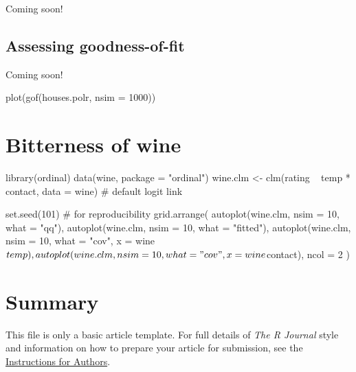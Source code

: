Coming soon!


\subsection{Assessing goodness-of-fit}

Coming soon!

\begin{example}
  plot(gof(houses.polr, nsim = 1000))
\end{example}


\section{Bitterness of wine}

\begin{example}
  library(ordinal)
  data(wine, package = "ordinal")
  wine.clm <- clm(rating ~ temp * contact, data = wine)  # default logit link
\end{example}

\begin{example}
set.seed(101)  # for reproducibility
grid.arrange(
  autoplot(wine.clm, nsim = 10, what = "qq"),
  autoplot(wine.clm, nsim = 10, what = "fitted"),
  autoplot(wine.clm, nsim = 10, what = "cov", x = wine$temp),
  autoplot(wine.clm, nsim = 10, what = "cov", x = wine$contact),
  ncol = 2
)
\end{example}



\section{Summary}

This file is only a basic article template. For full details of \emph{The R Journal} style and information on how to prepare your article for submission, see the \href{https://journal.r-project.org/share/author-guide.pdf}{Instructions for Authors}.


